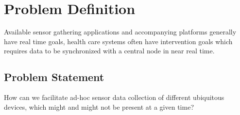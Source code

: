 
\section{Problem Definition} 
\label{sec:problem_definition}



Available sensor gathering applications and accompanying platforms generally have real time goals, health care systems often have intervention goals which requires data to be synchronized with a central node in near real time. 


\subsection{Problem Statement}
\label{sub:problem_statement}


How can we facilitate ad-hoc sensor data collection of different ubiquitous devices, which might and might not be present at a given time? 
